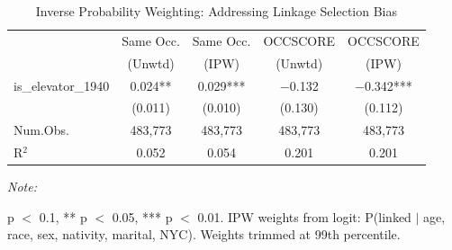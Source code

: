 \begin{table}[!h]
\centering
\caption{Inverse Probability Weighting: Addressing Linkage Selection Bias}
\begin{threeparttable}
\small
\begin{tabular}[t]{lcccc}
\toprule
 & Same Occ. & Same Occ. & OCCSCORE & OCCSCORE \\
 & (Unwtd) & (IPW) & (Unwtd) & (IPW) \\
\midrule
is\_elevator\_1940 & 0.024** & 0.029*** & $-$0.132 & $-$0.342*** \\
 & (0.011) & (0.010) & (0.130) & (0.112) \\
\midrule
Num.Obs. & 483,773 & 483,773 & 483,773 & 483,773 \\
R$^2$ & 0.052 & 0.054 & 0.201 & 0.201 \\
\bottomrule
\end{tabular}
\begin{tablenotes}
\item \textit{Note: }
\item * p $<$ 0.1, ** p $<$ 0.05, *** p $<$ 0.01. IPW weights from logit: P(linked $|$ age, race, sex, nativity, marital, NYC). Weights trimmed at 99th percentile.
\end{tablenotes}
\end{threeparttable}
\end{table}
